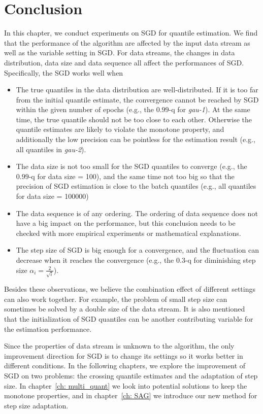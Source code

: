\section{Conclusion}
In this chapter, we conduct experiments on SGD for quantile estimation. We find that the performance of the algorithm are affected by the input data stream as well as the variable setting in SGD. For data streams, the changes in data distribution, data size and data sequence all affect the performances of SGD. Specifically, the SGD works well when
\begin{itemize}
    \item The true quantiles in the data distribution are well-distributed. If it is too far from the initial quantile estimate, the convergence cannot be reached by SGD within the given number of epochs (e.g., the $0.99$-q for \textit{gau-1}).
    At the same time, the true quantile should not be too close to each other. Otherwise 
    the quantile estimates are likely to violate the monotone property, and additionally the low precision can be pointless for the estimation result (e.g., all quantiles in \textit{gau-2}). 
    
    \item The data size is not too small for the SGD quantiles to converge (e.g., the $0.99$-q for data size = 100), and the same time not too big so that the precision of SGD estimation is close to the batch quantiles (e.g., all quantiles for data size = 100000)
    
    \item The data sequence is of any ordering. The ordering of data sequence does not have a big impact on the performance, but this conclusion needs to be checked with more empirical experiments or mathematical explanations.
    
    \item The step size of SGD is big enough for a convergence, and the fluctuation can decrease when it reaches the convergence (e.g., the $0.3$-q for diminishing step size $\alpha_i = \frac{2}{\sqrt{i}}$).
\end{itemize}

Besides these observations, we believe the combination effect of different settings can also work together. For example, the problem of small step size can sometimes be solved by a double size of the data stream. It is also mentioned that the initialization of SGD quantiles can be another contributing variable for the estimation performance. 

Since the properties of data stream is unknown to the algorithm, the only improvement direction for SGD is to change its settings so it works better in different conditions. In the following chapters, we explore the improvement of SGD on two problems: the crossing quantile estimates and the adaptation of step size. In chapter~\ref{ch: multi_quant} we look into potential solutions to keep the monotone properties, and in chapter~\ref{ch: SAG} we introduce our new method for step size adaptation.
% 
